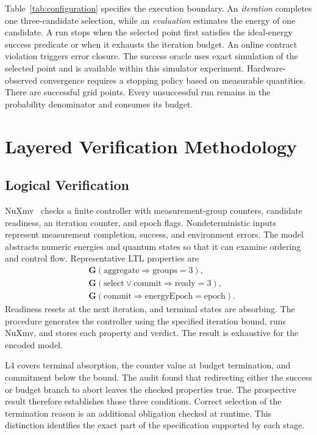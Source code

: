 \documentclass[conference]{IEEEtran}
\begin{document}
Table~\ref{tab:configuration} specifies the execution boundary. An \emph{iteration} completes one three-candidate selection, while an \emph{evaluation} estimates the energy of one candidate. A run stops when the selected point first satisfies the ideal-energy success predicate or when it exhausts the iteration budget. An online contract violation triggers error closure. The success oracle uses exact simulation of the selected point and is available within this simulator experiment. Hardware-observed convergence requires a stopping policy based on measurable quantities. There are \SuccessPoints successful grid points. Every unsuccessful run remains in the probability denominator and consumes its budget.

\section{Layered Verification Methodology}
\label{sec:methods}
\subsection{Logical Verification}
NuXmv~\cite{nuxmv} checks a finite controller with measurement-group counters, candidate readiness, an iteration counter, and epoch flags. Nondeterministic inputs represent measurement completion, success, and environment errors. The model abstracts numeric energies and quantum states so that it can examine ordering and control flow. Representative LTL properties are
\begin{align}
 &\mathbf G(\mathrm{aggregate}\Rightarrow\mathrm{groups}=3),\nonumber\\
 &\mathbf G(\mathrm{select}\lor\mathrm{commit}\Rightarrow\mathrm{ready}=3),\nonumber\\
 &\mathbf G(\mathrm{commit}\Rightarrow\mathrm{energyEpoch}=\mathrm{epoch}).
 \label{eq:logical}
\end{align}
Readiness resets at the next iteration, and terminal states are absorbing. The procedure generates the controller using the specified iteration bound, runs NuXmv, and stores each property and verdict. The result is exhaustive for the encoded model.

L4 covers terminal absorption, the counter value at budget termination, and commitment below the bound. The audit found that redirecting either the success or budget branch to abort leaves the checked properties true. The prospective result therefore establishes those three conditions. Correct selection of the termination reason is an additional obligation checked at runtime. This distinction identifies the exact part of the specification supported by each stage.
\end{document}
